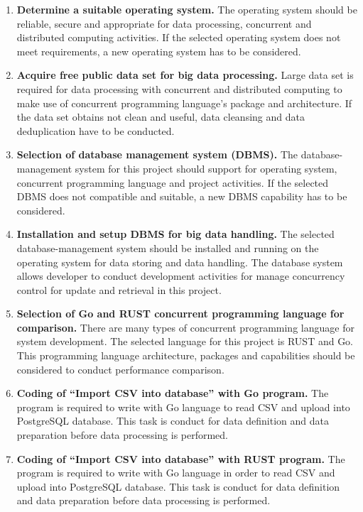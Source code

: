 \begin{enumerate}
\item \textbf{Determine a suitable operating system.} The operating system should be reliable, secure and appropriate for data processing, concurrent and distributed computing activities. If the selected operating system does not meet requirements, a new operating system has to be considered.

\item \textbf{Acquire free public data set for big data processing.} Large data set is required for data processing with concurrent and distributed computing to make use of concurrent programming language’s package and architecture. If the data set obtains not clean and useful, data cleansing and data deduplication have to be conducted.

\item \textbf{Selection of database management system (DBMS). } The database-management system for this project should support for operating system, concurrent programming language and project activities. If the selected DBMS does not compatible and suitable, a new DBMS capability has to be considered. 

\item \textbf{Installation and setup DBMS for big data handling.} The selected database-management system should be installed and running on the operating system for data storing and data handling. The database system allows developer to conduct development activities for manage concurrency control for update and retrieval in this project.

\item \textbf{Selection of Go and RUST concurrent programming language for comparison. } There are many types of concurrent programming language for system development. The selected language for this project is RUST and Go. This programming language architecture, packages and capabilities should be considered to conduct performance comparison.

\item \textbf{Coding of “Import CSV into database” with Go program.} The program is required to write with Go language to read CSV and upload into PostgreSQL database. This task is conduct for data definition and data preparation before data processing is performed. 

\item \textbf{Coding of “Import CSV into database” with RUST program. } The program is required to write with Go language in order to read CSV and upload into PostgreSQL database. This task is conduct for data definition and data preparation before data processing is performed. 


\end{enumerate}
